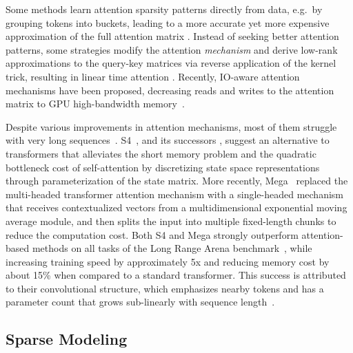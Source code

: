 Some methods learn attention sparsity patterns directly from data, e.g.~by grouping tokens into buckets, leading to a more accurate yet more expensive approximation of the full attention matrix \citep{kitaev2020reformer,DarasSMYRF2020,roy2021efficient}. Instead of seeking better attention patterns, some strategies modify the attention \textit{mechanism} and derive low-rank approximations to the query-key matrices via reverse application of the kernel trick, resulting in linear time attention \citep{katharopoulos2020transformers,choromanski2020rethinking,RFA,zhai2021attention}. Recently, IO-aware attention mechanisms have been proposed, decreasing reads and writes to the attention matrix to GPU high-bandwidth memory~\citep{Dao2022-yl}.

Despite various improvements in attention mechanisms, most of them struggle with very long sequences~\citep{tay2021long}. S4~\citep{gu2021efficiently}, and its successors \citep{gupta2022diagonal,mehta2022long,gu2022parameterization}, suggest an alternative to transformers that alleviates the short memory problem and the quadratic bottleneck cost of self-attention by discretizing state space representations through parameterization of the state matrix. More recently, Mega~\citep{ma2022mega} replaced the multi-headed transformer attention mechanism with a single-headed mechanism that receives contextualized vectors from a multidimensional exponential moving average module, and then splits the input into multiple fixed-length chunks to reduce the computation cost. Both S4 and Mega strongly outperform attention-based methods on all tasks of the Long Range Arena benchmark~\citep{tay2021long}, while increasing training speed by approximately 5x and reducing memory cost by about 15\% when compared to a standard transformer. This success is attributed to their convolutional structure, which emphasizes nearby tokens and has a parameter count that grows sub-linearly with sequence length~\citep{li2022makes}.

\subsection{Sparse Modeling}  

